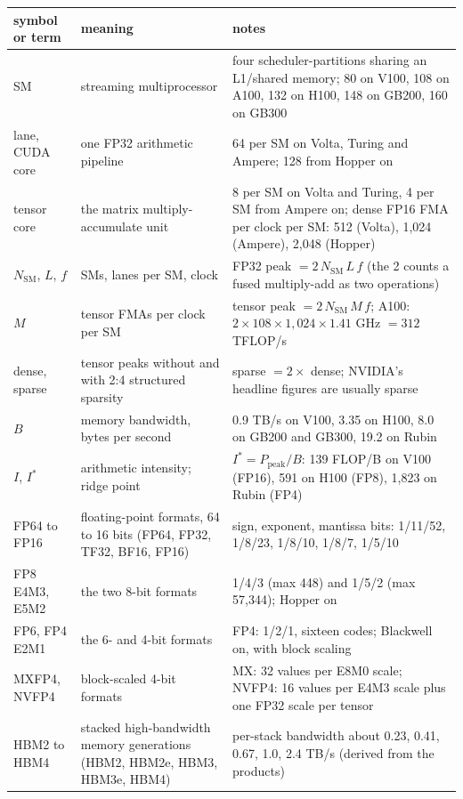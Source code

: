 \documentclass[11pt,letterpaper]{article}
\begin{document}
\begin{center}\footnotesize\setlength{\tabcolsep}{4pt}
\begin{tabular}{@{}lp{4.6cm}p{6.3cm}@{}}
\toprule
symbol or term & meaning & notes\\
\midrule
SM & streaming multiprocessor & four scheduler-partitions sharing an L1/shared memory; 80 on V100, 108 on A100, 132 on H100, 148 on GB200, 160 on GB300\\
lane, CUDA core & one FP32 arithmetic pipeline & 64 per SM on Volta, Turing and Ampere; 128 from Hopper on\\
tensor core & the matrix multiply-accumulate unit & 8 per SM on Volta and Turing, 4 per SM from Ampere on; dense FP16 FMA per clock per SM: 512 (Volta), 1{,}024 (Ampere), 2{,}048 (Hopper)\\
$N_{\mathrm{SM}}$, $L$, $f$ & SMs, lanes per SM, clock & FP32 peak $= 2\,N_{\mathrm{SM}}\,L\,f$ (the 2 counts a fused multiply-add as two operations)\\
$M$ & tensor FMAs per clock per SM & tensor peak $= 2\,N_{\mathrm{SM}}\,M\,f$; A100: $2\times 108\times 1{,}024\times 1.41$ GHz $= 312$ TFLOP/s\\
dense, sparse & tensor peaks without and with 2:4 structured sparsity & sparse $= 2\times$ dense; NVIDIA's headline figures are usually sparse\\
$B$ & memory bandwidth, bytes per second & 0.9 TB/s on V100, 3.35 on H100, 8.0 on GB200 and GB300, 19.2 on Rubin\\
$I$, $I^\ast$ & arithmetic intensity; ridge point & $I^\ast = P_{\text{peak}}/B$: 139 FLOP/B on V100 (FP16), 591 on H100 (FP8), 1{,}823 on Rubin (FP4)\\
FP64 to FP16 & floating-point formats, 64 to 16 bits (FP64, FP32, TF32, BF16, FP16) & sign, exponent, mantissa bits: 1/11/52, 1/8/23, 1/8/10, 1/8/7, 1/5/10\\
FP8 E4M3, E5M2 & the two 8-bit formats & 1/4/3 (max 448) and 1/5/2 (max 57{,}344); Hopper on\\
FP6, FP4 E2M1 & the 6- and 4-bit formats & FP4: 1/2/1, sixteen codes; Blackwell on, with block scaling\\
MXFP4, NVFP4 & block-scaled 4-bit formats & MX: 32 values per E8M0 scale; NVFP4: 16 values per E4M3 scale plus one FP32 scale per tensor\\
HBM2 to HBM4 & stacked high-bandwidth memory generations (HBM2, HBM2e, HBM3, HBM3e, HBM4) & per-stack bandwidth about 0.23, 0.41, 0.67, 1.0, 2.4 TB/s (derived from the products)\\

\end{tabular}
\end{center}
\end{document}
